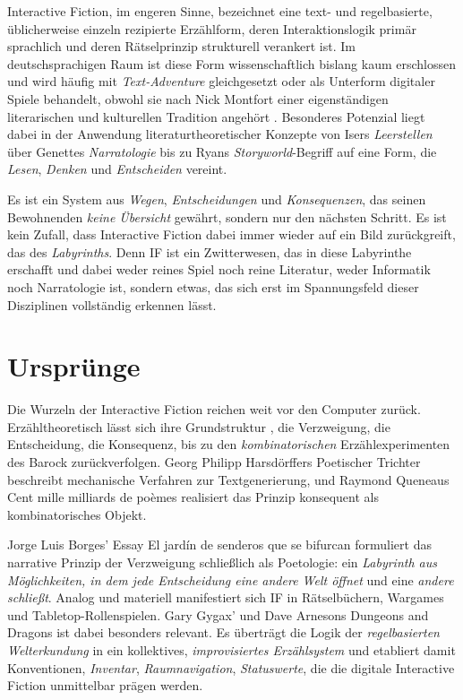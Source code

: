 \documentclass[parskip=half,a4paper,11pt]{scrreprt}
\begin{document}
Interactive Fiction, im engeren Sinne, bezeichnet eine text- und regelbasierte, üblicherweise einzeln rezipierte Erzählform, deren Interaktionslogik primär sprachlich und deren Rätselprinzip strukturell verankert ist. Im deutschsprachigen Raum ist diese Form wissenschaftlich bislang kaum erschlossen und wird häufig mit \textit{Text-Adventure} gleichgesetzt oder als Unterform digitaler Spiele behandelt, obwohl sie nach Nick Montfort einer eigenständigen literarischen und kulturellen Tradition angehört \citep{Montfort2003}. Besonderes Potenzial liegt dabei in der Anwendung literaturtheoretischer Konzepte von Isers \textit{Leerstellen} über Genettes \textit{Narratologie} bis zu Ryans \textit{Storyworld}-Begriff auf eine Form, die \textit{Lesen}, \textit{Denken} und \textit{Entscheiden} vereint.

Es ist ein System aus \textit{Wegen}, \textit{Entscheidungen }und\textit{ Konsequenzen}, das seinen Bewohnenden\textit{ keine Übersicht} gewährt, sondern nur den nächsten Schritt. Es ist kein Zufall, dass Interactive Fiction dabei immer wieder auf ein Bild zurückgreift, das des \textit{Labyrinths}. Denn IF ist ein Zwitterwesen, das in diese Labyrinthe erschafft und dabei weder reines Spiel noch reine Literatur, weder Informatik noch Narratologie ist, sondern etwas, das sich erst im Spannungsfeld dieser Disziplinen vollständig erkennen lässt.

\section{Ursprünge}

Die Wurzeln der Interactive Fiction reichen weit vor den Computer zurück. Erzähltheoretisch lässt sich ihre Grundstruktur , die Verzweigung, die Entscheidung, die Konsequenz,  bis zu den \textit{kombinatorischen} Erzählexperimenten des Barock zurückverfolgen. Georg Philipp Harsdörffers Poetischer Trichter \citep{Harsdoerffer1647} beschreibt mechanische Verfahren zur Textgenerierung, und Raymond Queneaus Cent mille milliards de poèmes \citep{Queneau1961} realisiert das Prinzip konsequent als kombinatorisches Objekt. 

Jorge Luis Borges' Essay El jardín de senderos que se bifurcan \citep{Borges1941} formuliert das narrative Prinzip der Verzweigung schließlich als Poetologie: ein \textit{Labyrinth aus Möglichkeiten, in dem jede Entscheidung eine andere Welt öffnet} und eine \textit{andere schließt}. Analog und materiell manifestiert sich IF in Rätselbüchern, Wargames und Tabletop-Rollenspielen. Gary Gygax' und Dave Arnesons Dungeons and Dragons \citep{Gygax1974} ist dabei besonders relevant. Es überträgt die Logik der \textit{regelbasierten Welterkundung} in ein kollektives, \textit{improvisiertes Erzählsystem} und etabliert damit Konventionen, \textit{Inventar}, \textit{Raumnavigation}, \textit{Statuswerte}, die die digitale Interactive Fiction unmittelbar prägen werden. 
\end{document}
